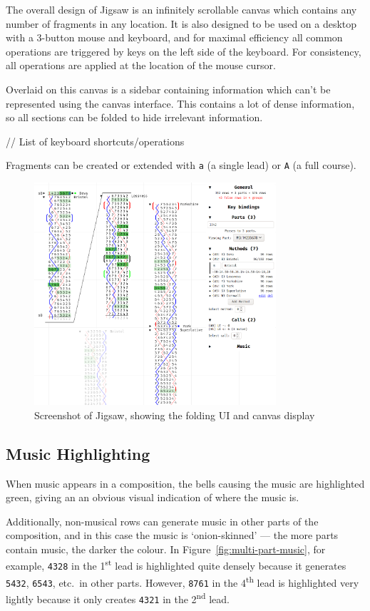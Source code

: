 \documentclass[12pt]{article}
\newcommand{\row}[1]{\texttt{#1}}
\newcommand{\nth}[2]{#1\textsuperscript{#2}}
\begin{document}
The overall design of Jigsaw is an infinitely scrollable canvas which contains any number of
fragments in any location.  It is also designed to be used on a desktop with a 3-button mouse and
keyboard, and for maximal efficiency all common operations are triggered by keys on the left side of
the keyboard.  For consistency, all operations are applied at the location of the mouse cursor.

Overlaid on this canvas is a sidebar containing information which can't be represented using the
canvas interface.  This contains a lot of dense information, so all sections can be folded to hide
irrelevant information.

// List of keyboard shortcuts/operations

Fragments can be created or extended with \verb|a| (a single lead) or \verb|A| (a full course).

\begin{figure}
    \centering
    \includegraphics[width=0.8\textwidth]{current-screenshot-w-mute}
    \caption{Screenshot of Jigsaw, showing the folding UI and canvas display}\label{fig:cur-screenshot}
\end{figure}

\subsection{Music Highlighting}

When music appears in a composition, the bells causing the music are highlighted green, giving an
an obvious visual indication of where the music is.

Additionally, non-musical rows can generate music in other parts of the composition, and in this
case the music is `onion-skinned' --- the more parts contain music, the darker the colour.  In
Figure~\ref{fig:multi-part-music}, for example, \row{4328} in the \nth{1}{st} lead is highlighted quite
densely because it generates \row{5432}, \row{6543}, etc.\ in other parts.  However, \row{8761} in
the \nth{4}{th} lead is highlighted very lightly because it only creates \row{4321} in the \nth{2}{nd}
lead.
\end{document}
